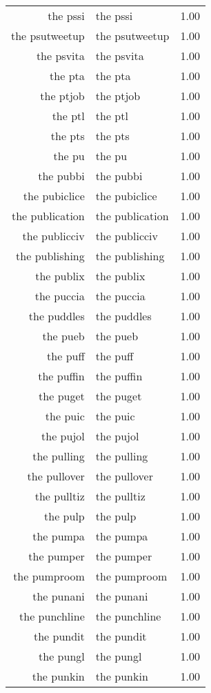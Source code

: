 \begin{table}[ht]
\begin{tabular}{rlr}
  the pssi & the pssi & 1.00 \\ 
  the psutweetup & the psutweetup & 1.00 \\ 
  the psvita & the psvita & 1.00 \\ 
  the pta & the pta & 1.00 \\ 
  the ptjob & the ptjob & 1.00 \\ 
  the ptl & the ptl & 1.00 \\ 
  the pts & the pts & 1.00 \\ 
  the pu & the pu & 1.00 \\ 
  the pubbi & the pubbi & 1.00 \\ 
  the pubiclice & the pubiclice & 1.00 \\ 
  the publication & the publication & 1.00 \\ 
  the publicciv & the publicciv & 1.00 \\ 
  the publishing & the publishing & 1.00 \\ 
  the publix & the publix & 1.00 \\ 
  the puccia & the puccia & 1.00 \\ 
  the puddles & the puddles & 1.00 \\ 
  the pueb & the pueb & 1.00 \\ 
  the puff & the puff & 1.00 \\ 
  the puffin & the puffin & 1.00 \\ 
  the puget & the puget & 1.00 \\ 
  the puic & the puic & 1.00 \\ 
  the pujol & the pujol & 1.00 \\ 
  the pulling & the pulling & 1.00 \\ 
  the pullover & the pullover & 1.00 \\ 
  the pulltiz & the pulltiz & 1.00 \\ 
  the pulp & the pulp & 1.00 \\ 
  the pumpa & the pumpa & 1.00 \\ 
  the pumper & the pumper & 1.00 \\ 
  the pumproom & the pumproom & 1.00 \\ 
  the punani & the punani & 1.00 \\ 
  the punchline & the punchline & 1.00 \\ 
  the pundit & the pundit & 1.00 \\ 
  the pungl & the pungl & 1.00 \\ 
  the punkin & the punkin & 1.00 \\ 

\end{tabular}
\end{table}
